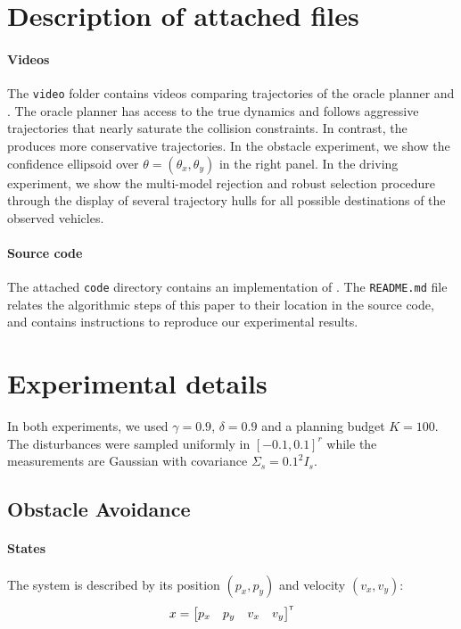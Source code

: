 \documentclass{article}
\begin{document}
\section{Description of attached files}
\label{sec:attachments}

\paragraph{Videos}
The \texttt{video} folder contains videos comparing trajectories of the oracle planner and . The oracle planner has access to the true dynamics and follows aggressive trajectories that nearly saturate the collision constraints. In contrast, the  produces more conservative trajectories. In the obstacle experiment, we show the confidence ellipsoid over $\theta = (\theta_x,\theta_y)$ in the right panel. In the driving experiment, we show the multi-model rejection and robust selection procedure through the display of several trajectory hulls for all possible destinations of the observed vehicles.

\paragraph{Source code}
The attached \texttt{code} directory contains an implementation of . The \texttt{README.md} file relates the algorithmic steps of this paper to their location in the source code, and contains instructions to reproduce our experimental results.

\section{Experimental details}
\label{sec:experimental-setting}

In both experiments, we used $\gamma=0.9$,  $\delta=0.9$ and a planning budget $K=100$. The disturbances were sampled uniformly in $[-0.1, 0.1]^r$ while the measurements are Gaussian with covariance $\Sigma_s = 0.1^2 I_s$. 

\subsection{Obstacle Avoidance}

\paragraph{States}

The system is described by its position $(p_x,p_y)$ and velocity $(v_x, v_y)$:
\begin{equation*}
x = \begin{bmatrix}
p_x & p_y & v_x & v_y
\end{bmatrix}^{\mathsf{\scriptscriptstyle T}}
\end{equation*}
\end{document}
